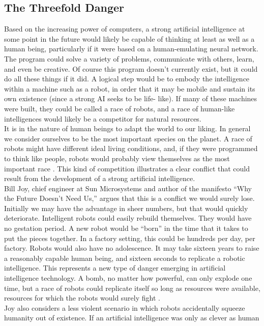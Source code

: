 \subsection{The Threefold Danger}
Based on the increasing power of computers, a strong artificial intelligence at
some point in the future would likely be capable of thinking at least as well as a human
being, particularly if it were based on a human-emulating neural network. The program
could solve a variety of problems, communicate with others, learn, and even be creative.
Of course this program doesn’t currently exist, but it could do all these things if it did. A
logical step would be to embody the intelligence within a machine such as a robot, in
order that it may be mobile and sustain its own existence (since a strong AI seeks to be
life- like). If many of these machines were built, they could be called a race of robots, and
a race of human-like intelligences would likely be a competitor for natural resources.\\
It is in the nature of human beings to adapt the world to our liking. In general we
consider ourselves to be the most important species on the planet. A race of robots might
have different ideal living conditions, and, if they were programmed to think like people,
robots would probably view themselves as the most important race \cite{two}. This kind
of competition illustrates a clear conflict that could result from the development of a
strong artificial intelligence.\\
Bill Joy, chief engineer at Sun Microsystems and author of the manifesto “Why
the Future Doesn’t Need Us,” argues that this is a conflict we would surely lose. Initially
we may have the advantage in sheer numbers, but that would quickly deteriorate. Intelligent robots could easily rebuild themselves. They would have no gestation period.
A new robot would be “born” in the time that it takes to put the pieces together. In a
factory setting, this could be hundreds per day, per factory. Robots would also have no
adolescence. It may take sixteen years to raise a reasonably capable human being, and
sixteen seconds to replicate a robotic intelligence. This represents a new type of danger
emerging in artificial intelligence technology. A bomb, no matter how powerful, can
only explode one time, but a race of robots could replicate itself so long as resources
were available, resources for which the robots would surely fight .\\
Joy also considers a less violent scenario in which robots accidentally squeeze
humanity out of existence. If an artificial intelligence was only as clever as human
